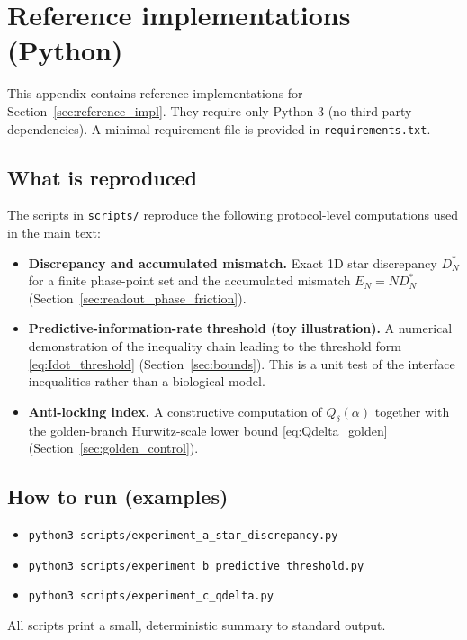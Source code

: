 \section{Reference implementations (Python)}
\label{app:repro_code}

This appendix contains reference implementations for Section~\ref{sec:reference_impl}.
They require only Python 3 (no third-party dependencies). A minimal requirement file is provided in \texttt{requirements.txt}.

\subsection{What is reproduced}
The scripts in \texttt{scripts/} reproduce the following protocol-level computations used in the main text:
\begin{itemize}
  \item \textbf{Discrepancy and accumulated mismatch.} Exact 1D star discrepancy $D_N^\ast$ for a finite phase-point set and the accumulated mismatch $E_N=N D_N^\ast$ (Section~\ref{sec:readout_phase_friction}).
  \item \textbf{Predictive-information-rate threshold (toy illustration).} A numerical demonstration of the inequality chain leading to the threshold form \eqref{eq:Idot_threshold} (Section~\ref{sec:bounds}). This is a unit test of the interface inequalities rather than a biological model.
  \item \textbf{Anti-locking index.} A constructive computation of $Q_\delta(\alpha)$ together with the golden-branch Hurwitz-scale lower bound \eqref{eq:Qdelta_golden} (Section~\ref{sec:golden_control}).
\end{itemize}

\subsection{How to run (examples)}
\begin{itemize}
  \item \texttt{python3 scripts/experiment\_a\_star\_discrepancy.py}
  \item \texttt{python3 scripts/experiment\_b\_predictive\_threshold.py}
  \item \texttt{python3 scripts/experiment\_c\_qdelta.py}
\end{itemize}
All scripts print a small, deterministic summary to standard output.


